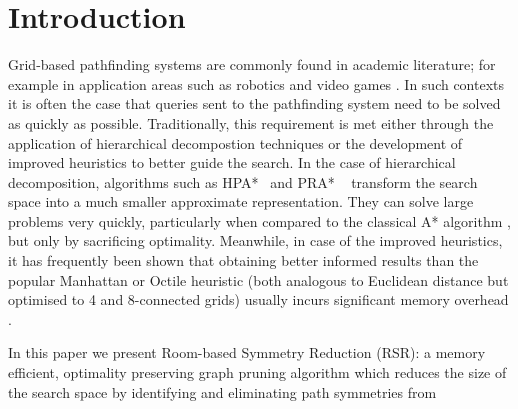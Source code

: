 \section{Introduction}
Grid-based pathfinding systems are commonly found in academic literature; for
example in application areas such as robotics \cite{choset05} and video games
\cite{botea04,sturtevant05,bjornsson06}.  
In such contexts it is often the case that queries sent to the pathfinding
system need to be solved as quickly as possible.  Traditionally, this
requirement is met either through the application of hierarchical decompostion
techniques or the development of improved heuristics to better guide the search.
In the case of hierarchical decomposition, algorithms such as
HPA*~\cite{botea04} and PRA* ~\cite{sturtevant05} transform the search space
into a much smaller approximate representation. They can solve large problems
very quickly, particularly when compared to the classical A* algorithm
\cite{hart68}, but only by sacrificing optimality.  Meanwhile, in case of the
improved heuristics, it has frequently been shown that obtaining better informed
results than the popular Manhattan or Octile heuristic (both analogous to
Euclidean distance but optimised to 4 and 8-connected grids) usually incurs
significant memory overhead \cite{sturtevant09,goldberg05,Cazenave:06}.
%
\par
In this paper we present Room-based Symmetry Reduction (RSR): a
memory efficient, optimality preserving graph pruning algorithm which reduces
the size of the search space by identifying and eliminating path symmetries from
